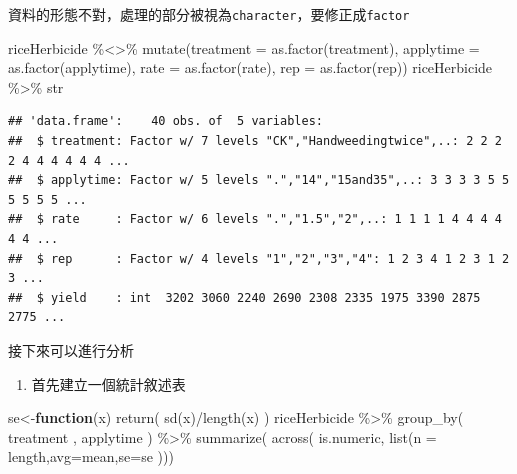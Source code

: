 \documentclass[
]{book}
\newenvironment{Shaded}{\begin{snugshade}}{\end{snugshade}}
\newcommand{\AttributeTok}[1]{\textcolor[rgb]{0.77,0.63,0.00}{#1}}
\newcommand{\ControlFlowTok}[1]{\textcolor[rgb]{0.13,0.29,0.53}{\textbf{#1}}}
\newcommand{\FunctionTok}[1]{\textcolor[rgb]{0.00,0.00,0.00}{#1}}
\newcommand{\NormalTok}[1]{#1}
\newcommand{\OtherTok}[1]{\textcolor[rgb]{0.56,0.35,0.01}{#1}}
\newcommand{\SpecialCharTok}[1]{\textcolor[rgb]{0.00,0.00,0.00}{#1}}
\newcommand{\StringTok}[1]{\textcolor[rgb]{0.31,0.60,0.02}{#1}}
\providecommand{\tightlist}{%
  \setlength{\itemsep}{0pt}\setlength{\parskip}{0pt}}
\begin{document}
資料的形態不對，處理的部分被視為\texttt{character}，要修正成\texttt{factor}

\begin{Shaded}
\begin{Highlighting}[]
\NormalTok{riceHerbicide }\SpecialCharTok{\%\textless{}\textgreater{}\%} 
  \FunctionTok{mutate}\NormalTok{(}\AttributeTok{treatment =} \FunctionTok{as.factor}\NormalTok{(treatment),}
         \AttributeTok{applytime =} \FunctionTok{as.factor}\NormalTok{(applytime),}
         \AttributeTok{rate =} \FunctionTok{as.factor}\NormalTok{(rate),}
         \AttributeTok{rep =} \FunctionTok{as.factor}\NormalTok{(rep))}
\NormalTok{riceHerbicide }\SpecialCharTok{\%\textgreater{}\%}\NormalTok{ str}
\end{Highlighting}
\end{Shaded}

\begin{verbatim}
## 'data.frame':    40 obs. of  5 variables:
##  $ treatment: Factor w/ 7 levels "CK","Handweedingtwice",..: 2 2 2 2 4 4 4 4 4 4 ...
##  $ applytime: Factor w/ 5 levels ".","14","15and35",..: 3 3 3 3 5 5 5 5 5 5 ...
##  $ rate     : Factor w/ 6 levels ".","1.5","2",..: 1 1 1 1 4 4 4 4 4 4 ...
##  $ rep      : Factor w/ 4 levels "1","2","3","4": 1 2 3 4 1 2 3 1 2 3 ...
##  $ yield    : int  3202 3060 2240 2690 2308 2335 1975 3390 2875 2775 ...
\end{verbatim}

接下來可以進行分析

\begin{enumerate}
\def\labelenumi{\arabic{enumi}.}
\tightlist
\item
  首先建立一個統計敘述表
\end{enumerate}

\begin{Shaded}
\begin{Highlighting}[]
\NormalTok{se}\OtherTok{\textless{}{-}}\ControlFlowTok{function}\NormalTok{(x) }\FunctionTok{return}\NormalTok{( }\FunctionTok{sd}\NormalTok{(x)}\SpecialCharTok{/}\FunctionTok{length}\NormalTok{(x) )}
\NormalTok{riceHerbicide }\SpecialCharTok{\%\textgreater{}\%} 
  \FunctionTok{group\_by}\NormalTok{( treatment , applytime ) }\SpecialCharTok{\%\textgreater{}\%} 
  \FunctionTok{summarize}\NormalTok{( }\FunctionTok{across}\NormalTok{( is.numeric, }\FunctionTok{list}\NormalTok{(}\StringTok{\textquotesingle{}n\textquotesingle{}} \OtherTok{=}\NormalTok{ length,}\StringTok{\textquotesingle{}avg\textquotesingle{}}\OtherTok{=}\NormalTok{mean,}\StringTok{\textquotesingle{}se\textquotesingle{}}\OtherTok{=}\NormalTok{se )))}
\end{Highlighting}
\end{Shaded}
\end{document}
